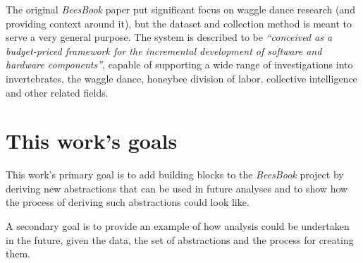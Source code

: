 The original \textit{BeesBook} paper put significant focus on waggle dance
research (and providing context around it), but the dataset and collection 
method is meant to serve a very general purpose. 
The system is described to be \textit{“conceived as a budget-priced framework
for the incremental development of software and hardware components”}, capable of
supporting a wide range of investigations into invertebrates, the waggle dance,
honeybee division of labor, collective intelligence and other related fields.



\section{This work's goals}
This work’s primary goal is to add building blocks to the \textit{BeesBook}
project by deriving new abstractions that can be used in future analyses and to
show how the process of deriving such abstractions could look like.

A secondary goal is to provide an example of how analysis could be undertaken in
the future, given the data, the set of abstractions and the process for creating
them. 